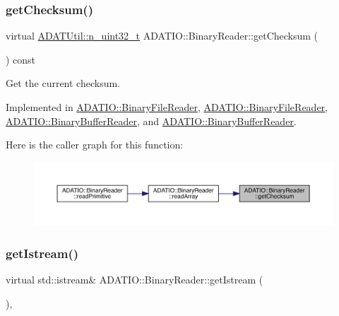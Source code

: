 \subsubsection{\texorpdfstring{getChecksum()}{getChecksum()}\hspace{0.1cm}{\footnotesize\ttfamily [2/2]}}
{\footnotesize\ttfamily virtual \mbox{\hyperlink{namespaceADATUtil_ad945a8afa4db2d1f89b731964adae97e}{A\+D\+A\+T\+Util\+::n\+\_\+uint32\+\_\+t}} A\+D\+A\+T\+I\+O\+::\+Binary\+Reader\+::get\+Checksum (\begin{DoxyParamCaption}{ }\end{DoxyParamCaption}) const\hspace{0.3cm}{\ttfamily [pure virtual]}}



Get the current checksum. 



Implemented in \mbox{\hyperlink{classADATIO_1_1BinaryFileReader_addb0cfdf4c3df174327b1abc136cfc68}{A\+D\+A\+T\+I\+O\+::\+Binary\+File\+Reader}}, \mbox{\hyperlink{classADATIO_1_1BinaryFileReader_addb0cfdf4c3df174327b1abc136cfc68}{A\+D\+A\+T\+I\+O\+::\+Binary\+File\+Reader}}, \mbox{\hyperlink{classADATIO_1_1BinaryBufferReader_ae8e6c22be76223f5e2ce2613e70be4bf}{A\+D\+A\+T\+I\+O\+::\+Binary\+Buffer\+Reader}}, and \mbox{\hyperlink{classADATIO_1_1BinaryBufferReader_ae8e6c22be76223f5e2ce2613e70be4bf}{A\+D\+A\+T\+I\+O\+::\+Binary\+Buffer\+Reader}}.

Here is the caller graph for this function\+:\nopagebreak
\begin{figure}[H]
\begin{center}
\leavevmode
\includegraphics[width=350pt]{da/dd9/classADATIO_1_1BinaryReader_acd705bb96d557a5437410b55beb40bda_icgraph}
\end{center}
\end{figure}
\mbox{\label{classADATIO_1_1BinaryReader_aa34e73d5f1e6b2b3b48c27e97f6a85a0}} 
\subsubsection{\texorpdfstring{getIstream()}{getIstream()}\hspace{0.1cm}{\footnotesize\ttfamily [1/2]}}
{\footnotesize\ttfamily virtual std\+::istream\& A\+D\+A\+T\+I\+O\+::\+Binary\+Reader\+::get\+Istream (\begin{DoxyParamCaption}{ }\end{DoxyParamCaption})\hspace{0.3cm}{\ttfamily [protected]}, {}}



